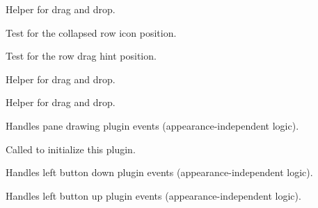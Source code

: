 Helper for drag and drop.


\label{cbrowdragpluginhittestcollapsedrowicon}


Test for the collapsed row icon position.


\label{cbrowdragpluginhittestrowdraghint}


Test for the row drag hint position.


\label{cbrowdragplugininsertdraggedrowbefore}


Helper for drag and drop.


\label{cbrowdragpluginitemisinfocus}


Helper for drag and drop.


\label{cbrowdragpluginondrawpanebackground}


Handles pane drawing plugin events (appearance-independent logic).


\label{cbrowdragpluginoninitplugin}


Called to initialize this plugin.


\label{cbrowdragpluginonlbuttondown}


Handles left button down plugin events (appearance-independent logic).


\label{cbrowdragpluginonlbuttonup}


Handles left button up plugin events (appearance-independent logic).


